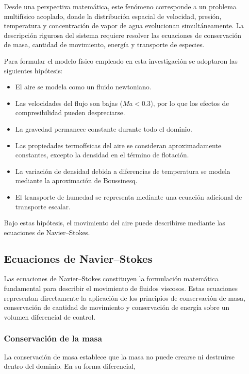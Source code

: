 Desde una perspectiva matemática, este fenómeno corresponde a un problema multifísico acoplado, donde la distribución espacial de velocidad, presión, temperatura y concentración de vapor de agua evolucionan simultáneamente. La descripción rigurosa del sistema requiere resolver las ecuaciones de conservación de masa, cantidad de movimiento, energía y transporte de especies.

Para formular el modelo físico empleado en esta investigación se adoptaron las siguientes hipótesis:

\begin{itemize}
\item El aire se modela como un fluido newtoniano.
\item Las velocidades del flujo son bajas ($Ma<0.3$), por lo que los efectos de compresibilidad pueden despreciarse.
\item La gravedad permanece constante durante todo el dominio.
\item Las propiedades termofísicas del aire se consideran aproximadamente constantes, excepto la densidad en el término de flotación.
\item La variación de densidad debida a diferencias de temperatura se modela mediante la aproximación de Boussinesq.
\item El transporte de humedad se representa mediante una ecuación adicional de transporte escalar.
\end{itemize}

Bajo estas hipótesis, el movimiento del aire puede describirse mediante las ecuaciones de Navier--Stokes.

\subsection{Ecuaciones de Navier--Stokes}

Las ecuaciones de Navier--Stokes constituyen la formulación matemática fundamental para describir el movimiento de fluidos viscosos. Estas ecuaciones representan directamente la aplicación de los principios de conservación de masa, conservación de cantidad de movimiento y conservación de energía sobre un volumen diferencial de control.

\subsubsection{Conservación de la masa}

La conservación de masa establece que la masa no puede crearse ni destruirse dentro del dominio. En su forma diferencial,

